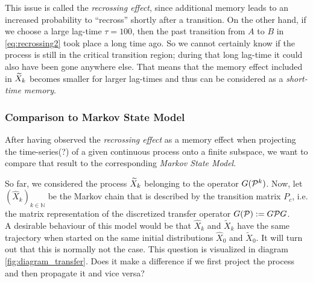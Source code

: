 

This issue is called the \textit{recrossing effect}, since additional memory 
leads to an increased probability to ``recross'' shortly after a transition.
On the other hand, if we choose a large lag-time $\tau = 100$, then the past transition from $A$ to $B$ in \eqref{eq:recrossing2} took place a long time ago. So we cannot certainly know if the process is still in the critical transition region; during that long lag-time it could also have been gone anywhere else.
That means that the memory effect included in $\widetilde{X}_k$ becomes smaller for larger lag-times and thus can be considered as a \textit{short-time memory}.

\subsubsection*{Comparison to Markov State Model}

After having observed the \textit{recrossing effect} as a memory effect when projecting the time-series(?) of a given continuous process onto a finite subspace, we want to compare that result to the corresponding \textit{Markov State Model}. 

So far, we considered the process $\widetilde{X}_k$ belonging to the operator $G(\mathcal{P}^k)$.
Now, let $(\widehat{X}_k)_{k\in\mathbb{N}}$ be the Markov chain that is described by the transition matrix $P_c$, i.e. the matrix representation of the discretized transfer operator $G(\mathcal{P}) := G\mathcal{P} G$.
\\

A desirable behaviour of this model would be that $\widehat{X}_k$ and $\widetilde{X}_k$ have the same trajectory when started on the same initial distributions $\widehat{X}_0$ and $\widetilde{X}_0$. It will turn out that this is normally not the case.
This question is visualized in diagram \ref{fig:diagram_transfer}.
Does it make a difference if we first project the process and then propagate it and vice versa?

